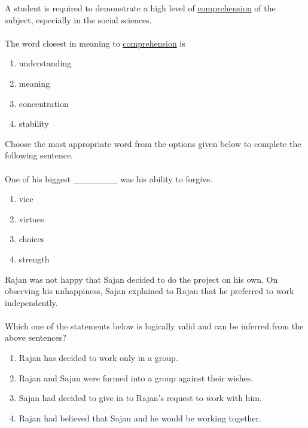     \item A student is required to demonstrate a high level of \underline{comprehension} of the subject, especially in the
    social sciences. \\ \\ The word closest in meaning to \underline{comprehension} is
        \begin{enumerate}
            \item understanding
            \item meaning
            \item concentration
            \item stability
        \end{enumerate}

    \item Choose the most appropriate word from the options given below to complete the following
    sentence. \\ \\ One of his biggest \_\_\_\_\_\_\_ was his ability to forgive.
        \begin{enumerate}
            \item vice
            \item virtues
            \item choices
            \item strength
        \end{enumerate}

    \item Rajan was not happy that Sajan decided to do the project on his own. On observing his unhappiness, Sajan explained to Rajan that he preferred to work independently. \\ \\ Which one of the statements below is logically valid and can be inferred from the above sentences?
        \begin{enumerate}
            \item Rajan has decided to work only in a group.
            \item Rajan and Sajan were formed into a group against their wishes.
            \item Sajan had decided to give in to Rajan's request to work with him.
            \item Rajan had believed that Sajan and he would be working together.
        \end{enumerate}
        
